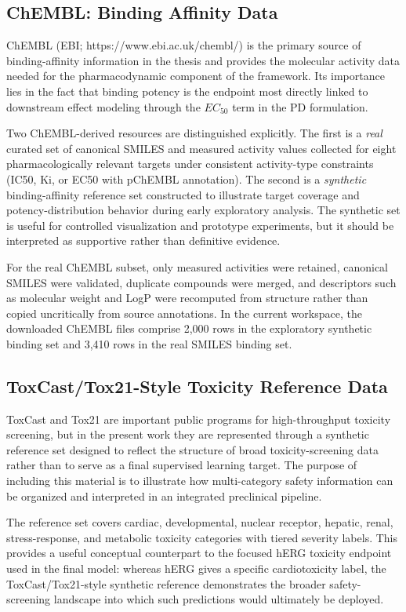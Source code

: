 \documentclass[a4paper,11pt,twoside]{report}
\begin{document}
\subsection{ChEMBL: Binding Affinity Data}

ChEMBL (EBI; https://www.ebi.ac.uk/chembl/) is the primary source of binding-affinity information in the thesis and provides the molecular activity data needed for the pharmacodynamic component of the framework. Its importance lies in the fact that binding potency is the endpoint most directly linked to downstream effect modeling through the $EC_{50}$ term in the PD formulation.

Two ChEMBL-derived resources are distinguished explicitly. The first is a \textit{real} curated set of canonical SMILES and measured activity values collected for eight pharmacologically relevant targets under consistent activity-type constraints (IC50, Ki, or EC50 with pChEMBL annotation). The second is a \textit{synthetic} binding-affinity reference set constructed to illustrate target coverage and potency-distribution behavior during early exploratory analysis. The synthetic set is useful for controlled visualization and prototype experiments, but it should be interpreted as supportive rather than definitive evidence.

For the real ChEMBL subset, only measured activities were retained, canonical SMILES were validated, duplicate compounds were merged, and descriptors such as molecular weight and LogP were recomputed from structure rather than copied uncritically from source annotations. In the current workspace, the downloaded ChEMBL files comprise 2,000 rows in the exploratory synthetic binding set and 3,410 rows in the real SMILES binding set.

\subsection{ToxCast/Tox21-Style Toxicity Reference Data}

ToxCast and Tox21 are important public programs for high-throughput toxicity screening, but in the present work they are represented through a synthetic reference set designed to reflect the structure of broad toxicity-screening data rather than to serve as a final supervised learning target. The purpose of including this material is to illustrate how multi-category safety information can be organized and interpreted in an integrated preclinical pipeline.

The reference set covers cardiac, developmental, nuclear receptor, hepatic, renal, stress-response, and metabolic toxicity categories with tiered severity labels. This provides a useful conceptual counterpart to the focused hERG toxicity endpoint used in the final model: whereas hERG gives a specific cardiotoxicity label, the ToxCast/Tox21-style synthetic reference demonstrates the broader safety-screening landscape into which such predictions would ultimately be deployed.
\end{document}
